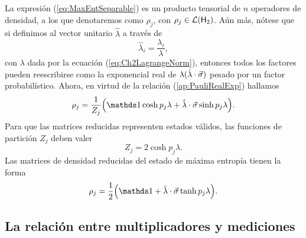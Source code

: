 
La expresión (\ref{eq:MaxEntSeparable}) es un producto tensorial de $n$ operadores de densidad, a los que denotaremos como $\rho_{j}$, con $\rho_{j}\in\mathcal{L}({\sf H}_{2})$. Aún más, nótese que si definimos al vector unitario $\hat{\lambda}$ a través de
\begin{equation}
    \hat{\lambda}_{i}=\frac{\lambda_{i}}{\lambda},\nonumber
\end{equation}
con $\lambda$ dada por la ecuación (\ref{eq:Ch2LagrangeNorm}), entonces todos los factores pueden reescribirse como la exponencial real de $\lambda(\hat{\lambda}\cdot\vec{\sigma})$ pesado por un factor probabilístico. Ahora, en virtud de la relación (\ref{ap:PauliRealExp}) hallamos
\begin{equation}
    \rho_{j}=\frac{1}{Z_{j}}\qty(\Id\cosh{p_{j}\lambda}+\paulivec{\lambda}\sinh{p_{j}\lambda}).\nonumber
\end{equation}
Para que las matrices reducidas representen estados válidos, las funciones de partición $Z_{j}$ deben valer
\begin{equation}
    Z_{j}=2\cosh{p_{j}\lambda}.\nonumber
\end{equation}
Las matrices de densidad reducidas del estado de máxima entropía tienen la forma
\begin{equation}\label{eq:rhoArhoB}
    \rho_{j}=\frac{1}{2}\qty(\Id+\paulivec{\lambda}\tanh{p_{j}\lambda}).
\end{equation}

\subsection{La relación entre multiplicadores y mediciones}



